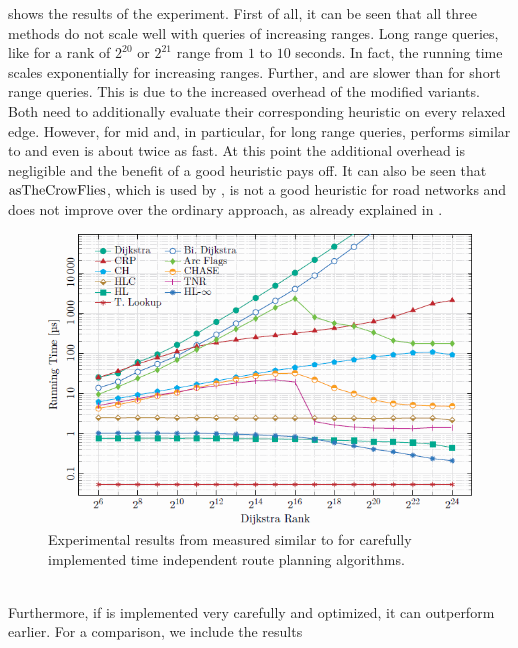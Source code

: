 	 shows the results of the experiment. First of all, it can be seen that all
	three methods do not scale well with queries of increasing ranges. Long range queries, like for a rank of $2^{20}$ or $2^{21}$ range
	from $1$ to $10$ seconds. In fact, the running time scales exponentially for increasing ranges. Further, \astar and \alt are slower
	than \dijkstra for short range queries. This is due to the increased overhead of the modified \dijkstra variants. Both need to
	additionally evaluate their corresponding heuristic on every relaxed edge. However, for mid and, in particular, for long
	range queries, \astar performs similar to \dijkstra and \alt even is about twice as fast. At this point the additional overhead is
	negligible and the benefit of a good heuristic pays off. It can also be seen that $\operatorname{asTheCrowFlies}$, which is used by \astar, is not a good
	heuristic for road networks and does not improve over the ordinary \dijkstra approach, as already explained in .\\
	\begin{figure}[!ht]
		 \begin{center}
			\includegraphics[scale=0.75]{res/uniModalTimeIndependentResultsExternal}
		\end{center}
		\caption{Experimental results from  measured similar to 
			for carefully implemented \uniModal time independent route planning algorithms.}
		\label{uniModalTimeIndependentResultsExternal}
	\end{figure}\quad\\
	Furthermore, if \alt is implemented very carefully and optimized, it can outperform \dijkstra earlier. For a comparison, we include the results
